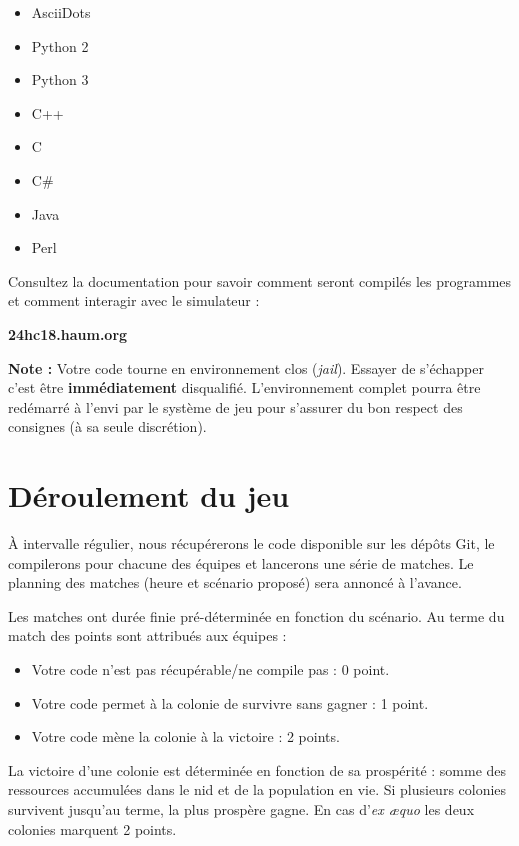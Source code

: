 \documentclass[a4paper, 11pt]{article}
\begin{document}
\begin{itemize}
	\item AsciiDots
	\item Python 2
	\item Python 3
	\item C++
	\item C
	\item C\#
	\item Java
	\item Perl
\end{itemize}

Consultez la documentation pour savoir comment seront compilés les programmes et comment
interagir avec le simulateur :

\begin{center}
	\color{Sblue}\Large\bfseries
	24hc18.haum.org
\end{center}

\textcolor{Sred}{
	\textbf{Note :} Votre code tourne en environnement clos (\textit{jail}). Essayer de
	s'échapper c'est être \textbf{immédiatement} disqualifié. L'environnement complet
	pourra être redémarré à l'envi par le système de jeu pour s'assurer du bon respect des
	consignes (à sa seule discrétion).
}

	\section{Déroulement du jeu}

À intervalle régulier, nous récupérerons le code disponible sur les dépôts Git,
le compilerons pour chacune des équipes et lancerons une série de matches. Le planning des
matches (heure et scénario proposé) sera annoncé à l'avance.


Les matches ont durée finie pré-déterminée en fonction du scénario. Au terme du match des
points sont attribués aux équipes :
\begin{itemize}
	\item Votre code n'est pas récupérable/ne compile pas : \textcolor{Sred}{0 point}.
	\item Votre code permet à la colonie de survivre sans gagner : \textcolor{Sred}{1 point}.
	\item Votre code mène la colonie à la victoire : \textcolor{Sred}{2 points}.
\end{itemize}

\bigskip

La victoire d'une colonie est déterminée en fonction de sa prospérité : somme des
ressources accumulées dans le nid et de la population en vie. Si plusieurs colonies
survivent jusqu'au terme, la plus prospère gagne. En cas d'\textit{ex æquo} les deux
colonies marquent 2 points.
\end{document}
